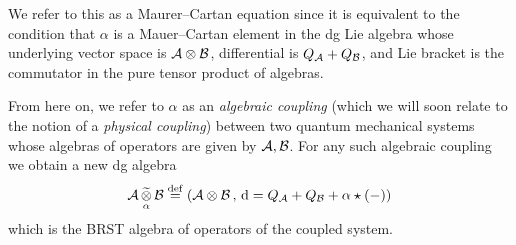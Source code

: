 \documentclass[11pt]{amsart}
\def\natalie#1{{\textcolor{green!65!black}{NMP: {#1}}}}
\begin{document}
We refer to this as a Maurer--Cartan equation since it is equivalent to the condition that $\alpha$ is a Mauer--Cartan element in the dg Lie algebra whose underlying vector space is $\mathcal A \otimes \mathcal B$, differential is $Q_{\mathcal A} + Q_{\mathcal B}$, and Lie bracket is the commutator in the pure tensor product of algebras. 

From here on, we refer to $\alpha$ as an {\em algebraic coupling} (which we will soon relate to the notion of a {\em physical coupling}) between two quantum mechanical systems whose algebras of operators are given by ${\mathcal A}, {\mathcal B}$. 
For any such algebraic coupling we obtain a new dg algebra 
\[
\mathcal A \, \underset{\alpha}{\widetilde{\otimes}} \, \mathcal B \overset{\rm def}{=} \left(\mathcal A \otimes \mathcal B \, , \, {\rm d} = Q_{\mathcal A} + Q_{\mathcal B} + \alpha \star (-) \right) 
\]
which is the BRST algebra of operators of the coupled system. 

%
%
%
%
%
\end{document}
